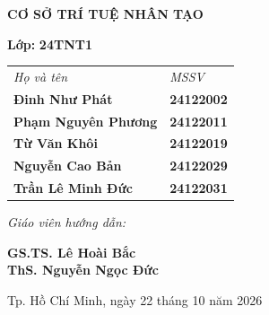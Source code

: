 \begin{titlepage}
\begin{center}
    \fontsize{14pt}{17pt}\selectfont
    \textbf{CƠ SỞ TRÍ TUỆ NHÂN TẠO}
\end{center}

\begin{center}
    \vspace{12pt}
    \textbf{Lớp:} \textbf{\large 24TNT1}
    \vspace{10pt}
    
    \renewcommand{\arraystretch}{1.3}
    {\large 
    \begin{tabular}{l @{\hspace{3cm}} l} 
        \textit{\small Họ và tên} & \textit{\small MSSV} \\
        \textbf{Đinh Như Phát}      & \textbf{24122002} \\
        \textbf{Phạm Nguyên Phương} & \textbf{24122011} \\
        \textbf{Từ Văn Khôi}        & \textbf{24122019} \\
        \textbf{Nguyễn Cao Bản}     & \textbf{24122029} \\
        \textbf{Trần Lê Minh Đức}   & \textbf{24122031} \\
    \end{tabular}
    }
    \vspace{10pt}
\end{center}

\vspace{12pt}

\begin{center}
    \fontsize{14pt}{17pt}\selectfont
    \textit{Giáo viên hướng dẫn:}

    \vspace{5pt}
    
    \textbf{GS.TS. Lê Hoài Bắc} \\
    \textbf{ThS. Nguyễn Ngọc Đức}
\end{center}

\vfill

\begin{center}
    Tp. Hồ Chí Minh, ngày 22 tháng 10 năm 2026
\end{center}

\end{titlepage}
